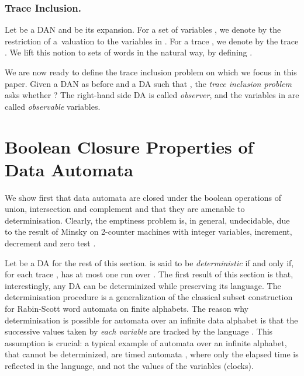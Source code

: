 \documentclass{llncs}
\begin{document}
\subsubsection{Trace Inclusion.}


Let  be a DAN and
 be its expansion. For a set of variables
, we denote by  the restriction of a~valuation  to the variables in
. For a trace , we denote by 
the trace . We lift this notion to sets of words in the natural
way, by defining .

We are now ready to define the trace inclusion problem on which we
focus in this paper. Given a DAN  as before and a DA
 such
that , the \emph{trace
  inclusion problem} asks whether ? The right-hand side DA
 is called \emph{observer}, and the variables in  are
called \emph{observable} variables.

\section{Boolean Closure Properties of Data Automata} \label{sec:boolean-closure}


We show first that data automata are closed under the boolean
operations of union, intersection and complement and that they are
amenable to determinisation. Clearly, the emptiness problem is, in
general, undecidable, due to the result of Minsky on 2-counter
machines with integer variables, increment, decrement and zero test
\cite{minsky67}.

Let  be
a DA for the rest of this section.  is said to be
\emph{deterministic} if and only if, for each trace ,  has at most one run over . The first result of
this section is that, interestingly, any DA can be determinized while
preserving its language. The determinisation procedure is a
generalization of the classical subset construction for Rabin-Scott
word automata on finite alphabets. The reason why determinisation is
possible for automata over an infinite data alphabet
 is that the successive values
taken by \emph{each variable}  are tracked by the
language . This assumption is crucial: a typical example of
automata over an infinite alphabet, that cannot be determinized, are
timed automata \cite{AlurDill94}, where only the elapsed time is
reflected in the language, and not the values of the variables
(clocks).
\end{document}
